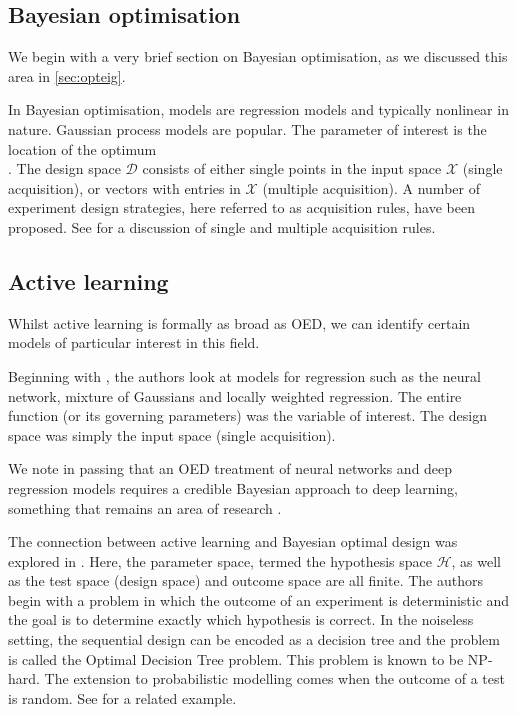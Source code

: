 \subsection{Bayesian optimisation}
We begin with a very brief section on Bayesian optimisation, as we discussed this area in \ref{sec:opteig}.

In Bayesian optimisation, models are regression models and typically nonlinear in nature. Gaussian process models are popular. The parameter of interest is the location of the optimum \\ \cite{pes}. The design space $\mathcal{D}$ consists of either single points in the input space $\mathcal{X}$ (single acquisition), or vectors with entries in $\mathcal{X}$ (multiple acquisition). A number of experiment design strategies, here referred to as acquisition rules, have been proposed. See \cite{ginsbourger2008, azimi2012} for a discussion of single and multiple acquisition rules.

\subsection{Active learning}
Whilst active learning is formally as broad as OED, we can identify certain models of particular interest in this field.

Beginning with \cite{cohn1996}, the authors look at models for regression such as the neural network, mixture of Gaussians and locally weighted regression. The entire function (or its governing parameters) was the variable of interest. The design space was simply the input space (single acquisition).

We note in passing that an OED treatment of neural networks and deep regression models requires a credible Bayesian approach to deep learning, something that remains an area of research \cite{gal2016}.

The connection between active learning and Bayesian optimal design was explored in \cite{golovin2010}. Here, the parameter space, termed the hypothesis space $\mathcal{H}$, as well as the test space (design space) and outcome space are all finite. The authors begin with a problem in which the outcome of an experiment is deterministic and the goal is to determine exactly which hypothesis is correct. In the noiseless setting, the sequential design can be encoded as a decision tree and the problem is called the Optimal Decision Tree problem. This problem is known to be NP-hard. The extension to probabilistic modelling comes when the outcome of a test is random. See \cite{nowak2009} for a related example.

